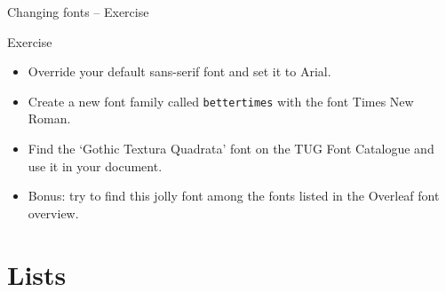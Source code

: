 \documentclass{beamer}
\begin{document}
\begin{frame}{Changing fonts -- Exercise}
    \begin{block}{Exercise}
        \begin{itemize}
            \item Override your default sans-serif font and set it to {\arial{}Arial}.
            \item Create a new font family called \texttt{bettertimes} with the font {\bettertimes{}Times New Roman}.
            \item Find the `Gothic Textura Quadrata' font on the TUG Font Catalogue and use it in your document.
            \item {\minya Bonus: try to find this jolly font among the fonts listed in the Overleaf font overview.}
        \end{itemize}
    \end{block}
\end{frame}

\section{Lists}
\end{document}
